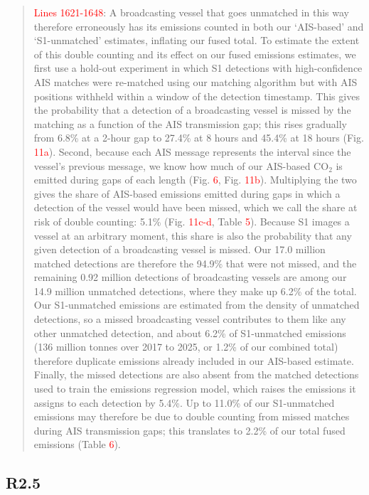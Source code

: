 \documentclass[11pt]{article}
\newcommand{\point}[1]{\subsection*{\normalfont\bfseries #1}}
\begin{document}
\begin{quote}
\textcolor{red}{Lines 1621-1648}: A broadcasting vessel that goes unmatched in this way therefore erroneously has its emissions counted in both our `AIS-based' and `S1-unmatched' estimates, inflating our fused total. To estimate the extent of this double counting and its effect on our fused emissions estimates, we first use a hold-out experiment in which S1 detections with high-confidence AIS matches were re-matched using our matching algorithm but with AIS positions withheld within a window of the detection timestamp. This gives the probability that a detection of a broadcasting vessel is missed by the matching as a function of the AIS transmission gap; this rises gradually from 6.8\% at a 2-hour gap to 27.4\% at 8 hours and 45.4\% at 18 hours (Fig. \textcolor{red}{11a}). Second, because each AIS message represents the interval since the vessel's previous message, we know how much of our AIS-based CO$_{2}$ is emitted during gaps of each length (Fig. \textcolor{red}{6}, Fig. \textcolor{red}{11b}). Multiplying the two gives the share of AIS-based emissions emitted during gaps in which a detection of the vessel would have been missed, which we call the share at risk of double counting: 5.1\% (Fig. \textcolor{red}{11c-d}, Table \textcolor{red}{5}). Because S1 images a vessel at an arbitrary moment, this share is also the probability that any given detection of a broadcasting vessel is missed. Our 17.0 million matched detections are therefore the 94.9\% that were not missed, and the remaining 0.92 million detections of broadcasting vessels are among our 14.9 million unmatched detections, where they make up 6.2\% of the total. Our S1-unmatched emissions are estimated from the density of unmatched detections, so a missed broadcasting vessel contributes to them like any other unmatched detection, and about 6.2\% of S1-unmatched emissions (136 million tonnes over 2017 to 2025, or 1.2\% of our combined total) therefore duplicate emissions already included in our AIS-based estimate. Finally, the missed detections are also absent from the matched detections used to train the emissions regression model, which raises the emissions it assigns to each detection by 5.4\%. Up to 11.0\% of our S1-unmatched emissions may therefore be due to double counting from missed matches during AIS transmission gaps; this translates to 2.2\% of our total fused emissions (Table \textcolor{red}{6}). 
\end{quote}

\point{R2.5}
\end{document}
